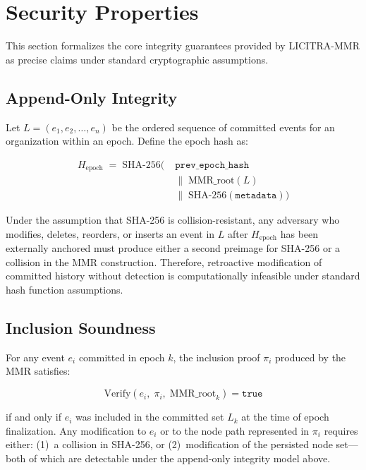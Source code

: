 \documentclass{article}
\begin{document}
\section{Security Properties}
\label{sec:security}

This section formalizes the core integrity guarantees provided by LICITRA-MMR
as precise claims under standard cryptographic assumptions.

\subsection{Append-Only Integrity}

Let $L = (e_1, e_2, \ldots, e_n)$ be the ordered sequence of committed events
for an organization within an epoch. Define the epoch hash as:

\begin{align*}
H_{\text{epoch}} \;=\; \text{SHA-256}\bigl(
  &\;\texttt{prev\_epoch\_hash} \\
  &\;\|\; \text{MMR\_root}(L) \\
  &\;\|\; \text{SHA-256}(\texttt{metadata})\bigr)
\end{align*}

Under the assumption that SHA-256 is collision-resistant, any adversary who
modifies, deletes, reorders, or inserts an event in $L$ after $H_{\text{epoch}}$
has been externally anchored must produce either a second preimage for SHA-256
or a collision in the MMR construction. Therefore, retroactive modification of
committed history without detection is computationally infeasible under standard
hash function assumptions.

\subsection{Inclusion Soundness}

For any event $e_i$ committed in epoch $k$, the inclusion proof $\pi_i$ produced
by the MMR satisfies:

\[
\text{Verify}(e_i,\;\pi_i,\;\text{MMR\_root}_k) = \texttt{true}
\]

if and only if $e_i$ was included in the committed set $L_k$ at the time of
epoch finalization. Any modification to $e_i$ or to the node path represented
in $\pi_i$ requires either: (1)~a collision in SHA-256, or (2)~modification of
the persisted node set---both of which are detectable under the append-only
integrity model above.
\end{document}
